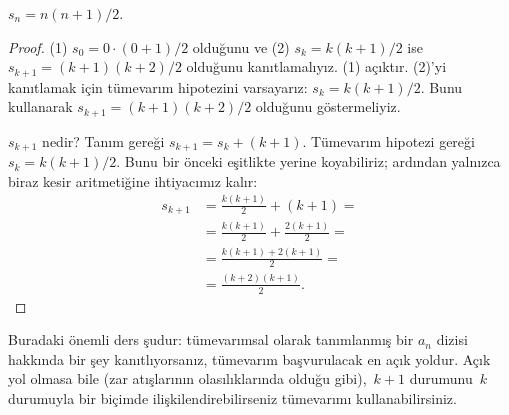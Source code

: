 \documentclass[../../../include/open-logic-section]{subfiles}
\begin{document}
\begin{prop}
  $s_n = n(n+1)/2$.
\end{prop}

\begin{proof}
  (1) $s_0 = 0\cdot(0 + 1)/2$ olduğunu ve (2) $s_k = k(k+1)/2$ ise
  $s_{k+1} = (k+1)(k+2)/2$ olduğunu kanıtlamalıyız. (1) açıktır.
  (2)'yi kanıtlamak için tümevarım hipotezini varsayarız: $s_k =
  k(k+1)/2$. Bunu kullanarak $s_{k+1} = (k+1)(k+2)/2$ olduğunu
  göstermeliyiz.

  $s_{k+1}$ nedir? Tanım gereği $s_{k+1} = s_k + (k+1)$. Tümevarım
  hipotezi gereği $s_k = k(k+1)/2$. Bunu bir önceki eşitlikte yerine
  koyabiliriz; ardından yalnızca biraz kesir aritmetiğine ihtiyacımız
  kalır:
  \begin{align*}
    s_{k+1} & = \frac{k(k+1)}{2} + (k+1) = {}\\
    & = \frac{k(k+1)}{2} + \frac{2(k+1)}{2} = {}\\
    & = \frac{k(k+1) + 2(k+1)}{2} = {}\\
    & = \frac{(k+2)(k+1)}{2}.
  \end{align*}
\end{proof}

Buradaki önemli ders şudur: tümevarımsal olarak tanımlanmış bir $a_n$
dizisi hakkında bir şey kanıtlıyorsanız, tümevarım başvurulacak en açık
yoldur. Açık yol olmasa bile (zar atışlarının olasılıklarında olduğu
gibi),~$k+1$ durumunu~$k$ durumuyla bir biçimde ilişkilendirebilirseniz
tümevarımı kullanabilirsiniz.
\end{document}
